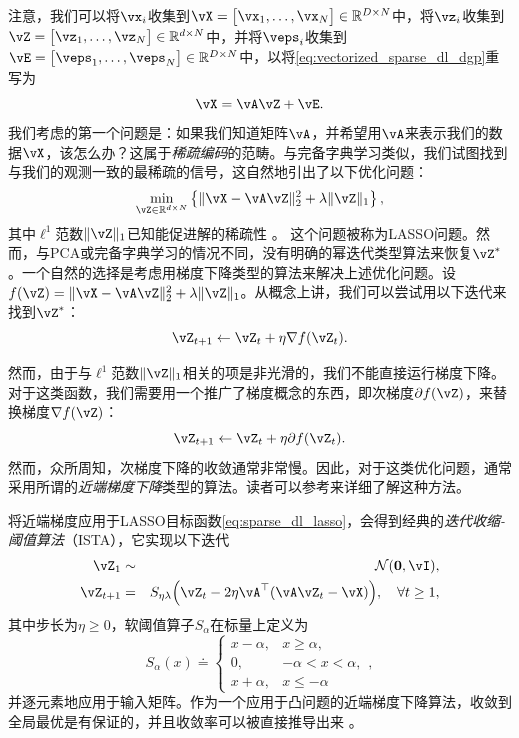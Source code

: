 \documentclass[../../book-main.tex]{subfiles}
\begin{document}
注意，我们可以将\(\vx_{i}\)收集到\(\vX = \mat{\vx_{1}, \dots, \vx_{N}} \in \R^{D \times N}\)中，将\(\vz_{i}\)收集到\(\vZ = \mat{\vz_{1}, \dots, \vz_{N}} \in \R^{d  \times N}\)中，并将\(\veps_{i}\)收集到\(\vE = \mat{\veps_{1}, \dots, \veps_{N}} \in \R^{D \times N}\)中，以将\eqref{eq:vectorized_sparse_dl_dgp}重写为
\begin{equation}\label{eq:sparse_dl_dgp}
    \vX = \vA\vZ + \vE.
\end{equation}
我们考虑的第一个问题是：如果我们知道矩阵\(\vA\)，并希望用\(\vA\)来表示我们的数据\(\vX\)，该怎么办？这属于\textit{稀疏编码}的范畴。与完备字典学习类似，我们试图找到与我们的观测一致的最稀疏的信号，这自然地引出了以下优化问题：
\begin{equation}\label{eq:sparse_dl_lasso}
    \min_{\vZ \in \R^{d \times N}}\bc{\norm{\vX - \vA\vZ}_{2}^{2} + \lambda \norm{\vZ}_{1}},
\end{equation}
其中\(\ell^1\)范数\(\norm{\vZ}_{1}\)已知能促进解的稀疏性 \cite{Wright-Ma-2022}。
这个问题被称为LASSO问题。然而，与PCA或完备字典学习的情况不同，没有明确的幂迭代类型算法来恢复\(\vZ^{\ast}\)。一个自然的选择是考虑用梯度下降类型的算法来解决上述优化问题。设\(f(\vZ) = \norm{\vX - \vA\vZ}_{2}^{2} + \lambda \norm{\vZ}_{1}\)。从概念上讲，我们可以尝试用以下迭代来找到\(\vZ^{\ast}\)：
\begin{equation}
    \vZ_{t+1} \leftarrow \vZ_t + \eta \nabla f(\vZ_t).
\end{equation}

然而，由于与\(\ell^1\)范数\(\norm{\vZ}_{1}\)相关的项是非光滑的，我们不能直接运行梯度下降。对于这类函数，我们需要用一个推广了梯度概念的东西，即次梯度\(\partial f(\vZ)\)，来替换梯度\(\nabla f(\vZ)\)：
\begin{equation}
    \vZ_{t+1} \leftarrow \vZ_t + \eta \partial f(\vZ_t).
\end{equation}
然而，众所周知，次梯度下降的收敛通常非常慢。因此，对于这类优化问题，通常采用所谓的\textit{近端梯度下降}类型的算法。读者可以参考\cite{Wright-Ma-2022}来详细了解这种方法。

将近端梯度应用于LASSO目标函数\eqref{eq:sparse_dl_lasso}，会得到经典的\textit{迭代收缩-阈值算法}（ISTA），它实现以下迭代
\begin{eqnarray}
    \vZ_{1} &\sim& \dNorm(\vzero, \vI), \\
    \vZ_{t + 1} &=& S_{\eta\lambda}\rp{\vZ_{t} - 2\eta \vA^{\top}(\vA\vZ_{t} - \vX)}, \quad \forall t \geq 1,\label{eq:ista_update}
\end{eqnarray}
其中步长为\(\eta \geq 0\)，软阈值算子\(S_{\alpha}\)在标量上定义为
\begin{equation}
    S_{\alpha}(x) \doteq \begin{cases}x - \alpha, & x \geq \alpha, \\ 0, & -\alpha < x < \alpha, \\ x + \alpha, & x \leq -\alpha\end{cases},
\end{equation}
并逐元素地应用于输入矩阵。作为一个应用于凸问题的近端梯度下降算法，收敛到全局最优是有保证的，并且收敛率可以被直接推导出来 \cite{Wright-Ma-2022}。
\end{document}
